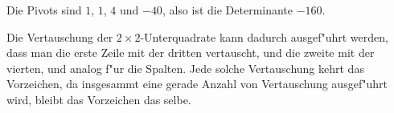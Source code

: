 \begin{loesung}
\begin{teilaufgaben}
Die Pivots sind $1$, $1$, $4$ und $-40$, also ist die Determinante $-160$.

\item Die Vertauschung der $2\times 2$-Unterquadrate kann dadurch
ausgef"uhrt werden, dass man die erste Zeile mit der dritten vertauscht,
und die zweite mit der vierten, und analog f"ur die Spalten. Jede
solche Vertauschung kehrt das Vorzeichen, da insgesammt eine gerade
Anzahl von Vertauschung ausgef"uhrt wird, bleibt das Vorzeichen das
selbe.
\end{teilaufgaben}
\end{loesung}
